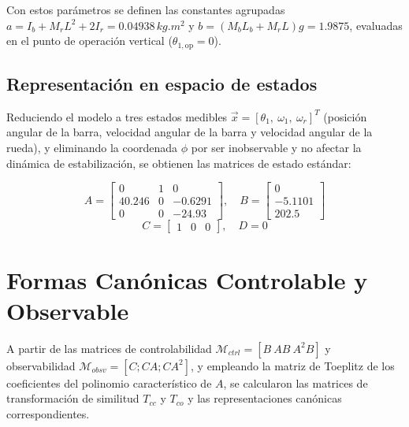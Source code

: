 \documentclass[conference]{IEEEtran}
\begin{document}
Con estos parámetros se definen las constantes agrupadas $a = I_b + M_r L^2 + 2I_r = 0.04938\,\si{kg.m^2}$ y $b=(M_b L_b + M_r L)g = 1.9875$, evaluadas en el punto de operación vertical ($\theta_{1,\text{op}}=0$).

\subsection{Representación en espacio de estados}

Reduciendo el modelo a tres estados medibles $\vec{x} = [\theta_1,\ \omega_1,\ \omega_r]^T$ (posición angular de la barra, velocidad angular de la barra y velocidad angular de la rueda), y eliminando la coordenada $\phi$ por ser inobservable y no afectar la dinámica de estabilización, se obtienen las matrices de estado estándar:

\begin{equation}
A = \begin{bmatrix} 0 & 1 & 0 \\ 40.246 & 0 & -0.6291 \\ 0 & 0 & -24.93 \end{bmatrix},\quad
B = \begin{bmatrix} 0 \\ -5.1101 \\ 202.5 \end{bmatrix}
\end{equation}
\begin{equation}
C = \begin{bmatrix} 1 & 0 & 0 \end{bmatrix}, \quad D = 0
\end{equation}

\section{Formas Canónicas Controlable y Observable}

A partir de las matrices de controlabilidad $\mathcal{M}_{ctrl}=[B\ AB\ A^2B]$ y observabilidad $\mathcal{M}_{obsv}=[C;CA;CA^2]$, y empleando la matriz de Toeplitz de los coeficientes del polinomio característico de $A$, se calcularon las matrices de transformación de similitud $T_{cc}$ y $T_{co}$ y las representaciones canónicas correspondientes.
\end{document}
